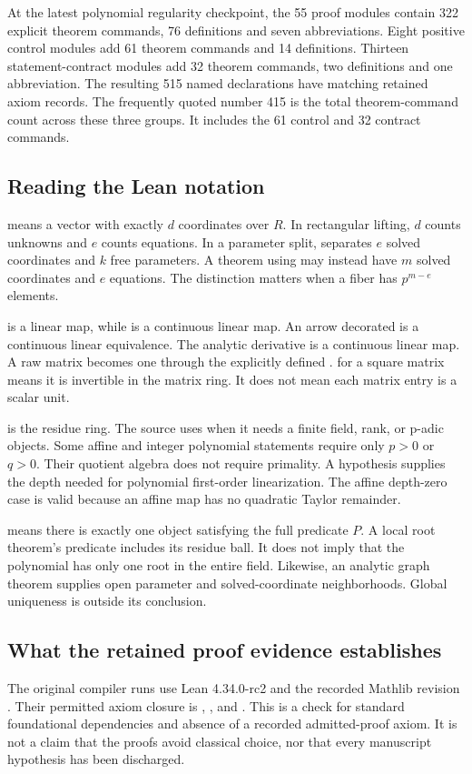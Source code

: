 At the latest polynomial regularity checkpoint, the 55 proof modules contain 322 explicit theorem commands, 76 definitions and seven abbreviations. Eight positive control modules add 61 theorem commands and 14 definitions. Thirteen statement-contract modules add 32 theorem commands, two definitions and one abbreviation. The resulting 515 named declarations have matching retained axiom records. The frequently quoted number 415 is the total theorem-command count across these three groups. It includes the 61 control and 32 contract commands.

\subsection{Reading the Lean notation}
 means a vector with exactly $d$ coordinates over $R$. In rectangular lifting, $d$ counts unknowns and $e$ counts equations. In a parameter split,  separates $e$ solved coordinates and $k$ free parameters. A theorem using  may instead have $m$ solved coordinates and $e$ equations. The distinction matters when a fiber has $p^{m-e}$ elements.

 is a linear map, while  is a continuous linear map. An arrow decorated  is a continuous linear equivalence. The analytic derivative is a continuous linear map. A raw matrix becomes one through the explicitly defined .  for a square matrix means it is invertible in the matrix ring. It does not mean each matrix entry is a scalar unit.

 is the residue ring. The source uses  when it needs a finite field, rank, or p-adic objects. Some affine and integer polynomial statements require only $p>0$ or $q>0$. Their quotient algebra does not require primality. A hypothesis  supplies the depth needed for polynomial first-order linearization. The affine depth-zero case is valid because an affine map has no quadratic Taylor remainder.

 means there is exactly one object satisfying the full predicate $P$. A local root theorem's predicate includes its residue ball. It does not imply that the polynomial has only one root in the entire field. Likewise, an analytic graph theorem supplies open parameter and solved-coordinate neighborhoods. Global uniqueness is outside its conclusion.

\subsection{What the retained proof evidence establishes}
The original compiler runs use Lean 4.34.0-rc2 and the recorded Mathlib revision . Their permitted axiom closure is , , and . This is a check for standard foundational dependencies and absence of a recorded admitted-proof axiom. It is not a claim that the proofs avoid classical choice, nor that every manuscript hypothesis has been discharged.


